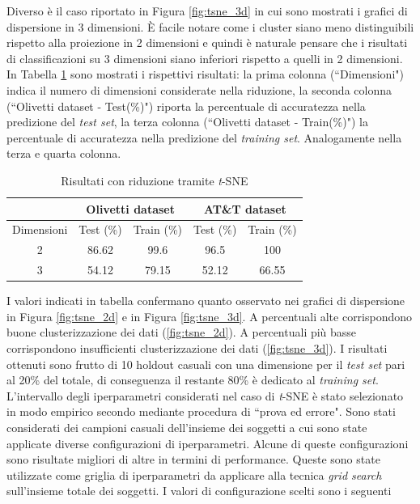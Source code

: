 \documentclass[12pt,italian]{report}
\begin{document}
Diverso è il caso riportato in Figura \ref{fig:tsne_3d} in cui sono mostrati i grafici di dispersione in 3 dimensioni. È facile notare come i cluster siano meno distinguibili rispetto alla proiezione in 2 dimensioni e quindi è naturale pensare che i risultati di classificazioni su 3 dimensioni siano inferiori rispetto a quelli in 2 dimensioni. In Tabella \ref{tab:tab_tsne} sono mostrati i rispettivi risultati: la prima colonna (``Dimensioni") indica il numero di dimensioni considerate nella riduzione, la seconda colonna (``Olivetti dataset - Test(\%)") riporta la percentuale di accuratezza nella predizione del \emph{test set}, la terza colonna (``Olivetti dataset - Train(\%)") la percentuale di accuratezza nella predizione del \emph{training set}. Analogamente nella terza e quarta colonna.

\begin{table}[h!]
	\centering

		\begin{tabular}{|c|c|c|c|c|}
			\hline
			\multicolumn{1}{|c|}{} & \multicolumn{2}{c|}{Olivetti dataset} & \multicolumn{2}{c|}{AT\&T dataset} \\ \hline
			Dimensioni             & Test (\%)   & Train    (\%)         & Test    (\%)        & Train    (\%)        \\ \hline
			2                      &            86.62       &           99.6        &           96.5      &      100            \\ \hline
			3                      &      54.12             &               79.15    &     52.12            &       66.55           \\ \hline
		\end{tabular}%
	\caption{Risultati con riduzione tramite \emph{t}-SNE}
	\label{tab:tab_tsne}
\end{table}

I valori indicati in tabella confermano quanto osservato nei grafici di dispersione in Figura \ref{fig:tsne_2d} e in Figura \ref{fig:tsne_3d}. A percentuali alte corrispondono buone clusterizzazione dei dati (\ref{fig:tsne_2d}). A percentuali più basse corrispondono insufficienti clusterizzazione dei dati (\ref{fig:tsne_3d}). I risultati ottenuti sono frutto di 10 holdout casuali con una dimensione per il \emph{test set} pari al 20\% del totale, di conseguenza il restante 80\% è dedicato al \emph{training set}. 
L'intervallo degli iperparametri considerati nel caso di \emph{t}-SNE è stato selezionato in modo empirico secondo mediante procedura di ``prova ed errore". Sono stati considerati dei campioni casuali dell'insieme dei soggetti a cui sono state applicate diverse configurazioni di iperparametri. Alcune di queste configurazioni sono risultate migliori di altre in termini di performance. Queste sono state utilizzate come griglia di iperparametri da applicare alla tecnica \emph{grid search} sull'insieme totale dei soggetti. I valori di configurazione scelti sono i seguenti 
\end{document}
